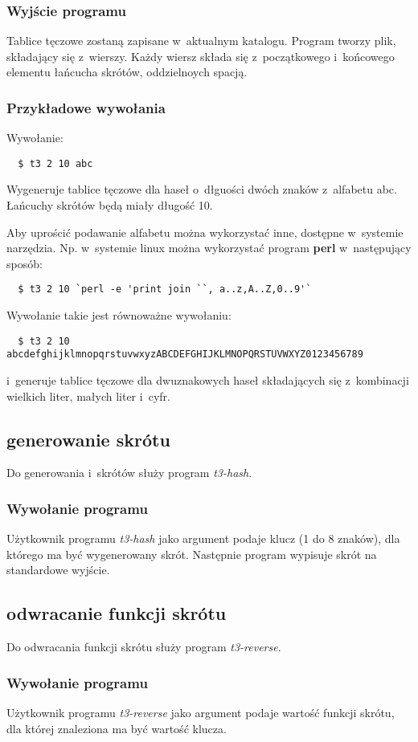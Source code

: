 \documentclass{article}
\begin{document}
\subsubsection{Wyjście programu}
Tablice tęczowe zostaną zapisane w~aktualnym katalogu.
Program tworzy plik, składający się z~wierszy. Każdy wiersz składa się z~początkowego i~końcowego elementu łańcucha skrótów, oddzielnoych spacją.

\subsubsection{Przykładowe wywołania}
Wywołanie:
\begin{lstlisting}
  $ t3 2 10 abc
\end{lstlisting}
Wygeneruje tablice tęczowe dla haseł o~dłguości dwóch znaków z~alfabetu abc. Łańcuchy skrótów będą miały długość 10.

Aby uprościć podawanie alfabetu można wykorzystać inne, dostępne w~systemie narzędzia. Np. w~systemie linux można wykorzystać program \textbf{perl} w~następujący sposób:
\begin{lstlisting}
  $ t3 2 10 `perl -e 'print join ``, a..z,A..Z,0..9'`
\end{lstlisting}
Wywołanie takie jest równoważne wywołaniu:
\begin{lstlisting}
  $ t3 2 10 abcdefghijklmnopqrstuvwxyzABCDEFGHIJKLMNOPQRSTUVWXYZ0123456789
\end{lstlisting}
i~generuje tablice tęczowe dla dwuznakowych haseł składających się z~kombinacji wielkich liter, małych liter i~cyfr.
\subsection{generowanie skrótu}
Do generowania i~skrótów służy program \emph{t3-hash}.
\subsubsection{Wywołanie programu}
Użytkownik programu \emph{t3-hash} jako argument podaje klucz (1 do 8 znaków), dla którego ma być wygenerowany skrót.
Następnie program wypisuje skrót na standardowe wyjście.


\subsection{odwracanie funkcji skrótu}
Do odwracania funkcji skrótu służy program \emph{t3-reverse}.
\subsubsection{Wywołanie programu}
Użytkownik programu \emph{t3-reverse} jako argument podaje wartość funkcji skrótu, dla której znaleziona ma być wartość klucza.
\end{document}
